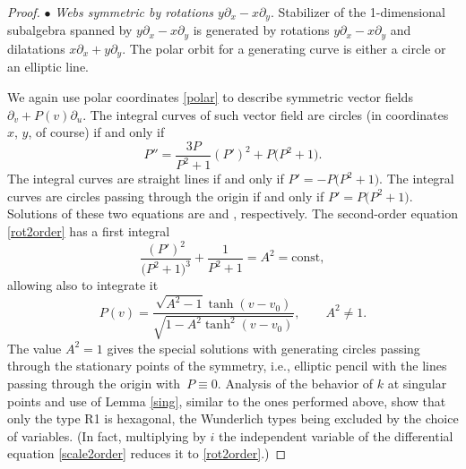 \documentclass[pdftex]{sigma}
\numberwithin{equation}{section}
\begin{document}
\begin{proof}
$\bullet$ {\it Webs symmetric by rotations $y\partial_x-x\partial_y$}.
Stabilizer of the 1-dimensional subalgebra spanned by $y\partial_x-x\partial_y$ is generated by rotations $y\partial_x-x\partial_y$ and dilatations $x\partial_x+y\partial_y$. The polar orbit for a generating curve is either a circle or an elliptic line.

We again use polar coordinates \eqref{polar} to describe symmetric vector fields $\partial_v+P(v)\partial_u$.
The integral curves of such vector field are circles (in coordinates $x$, $y$, of course)
if and only if
\begin{equation}\label{rot2order}
P''=\frac{3P}{P^2 + 1}(P')^2 + P\bigl(P^2 + 1\bigr).
\end{equation}
The integral curves are straight lines if and only if
$P'=-P\bigl(P^2+1\bigr)$. The integral curves are circles passing through the origin if and only if $P'=P\bigl(P^2+1\bigr)$. Solutions of these two equations are  and , respectively.
The second-order equation \eqref{rot2order} has a first integral
\[
\frac{(P')^2}{\bigl(P^2 + 1\bigr)^3} + \frac{1}{P^2 + 1} =A^2=\text{const},
\]
allowing also to integrate it
\[%
P(v)=\frac{\sqrt{A^2 - 1}\tanh(v - v_0)}{\sqrt{1 - A^2\tanh^2(v - v_0)}}, \qquad A^2\ne 1.
\]
The value $A^2=1$ gives the special solutions with generating circles passing through the stationary points of the symmetry, i.e., elliptic pencil with the lines passing through the origin with~${P\equiv 0}$.
Analysis of the behavior of $k$ at singular points and use of Lemma \ref{sing}, similar to the ones performed above, show that only the type R1 is hexagonal, the Wunderlich types being excluded by the choice of variables. (In fact, multiplying by $i$ the independent variable of the differential equation \eqref{scale2order} reduces it to \eqref{rot2order}.)


\end{proof}
\end{document}

